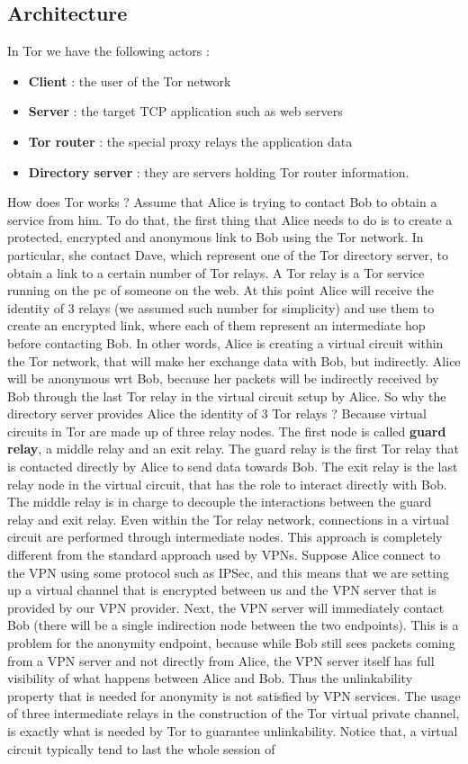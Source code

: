 \subsection{Architecture}
In Tor we have the following actors :
\begin{itemize}
\item \textbf{Client} : the user of the Tor network
\item \textbf{Server} : the target TCP application such as web servers
\item \textbf{Tor router} : the special proxy relays the application data
\item \textbf{Directory server} : they are servers holding Tor router information.
\end{itemize}
How does Tor works ? Assume that Alice is trying to contact Bob to obtain a service from him. To do that, the first thing that Alice needs to do is to create a protected, encrypted and anonymous link to Bob using the Tor network. In particular, she contact Dave, which represent one of the Tor directory server, to obtain a link to a certain number of Tor relays. A Tor relay is a Tor service running on the pc of someone on the web. At this point Alice will receive the identity of $3$ relays (we assumed such number for simplicity) and use them to create an encrypted link, where each of them represent an intermediate hop before contacting Bob. In other words, Alice is creating a virtual circuit within the Tor network, that will make her exchange data with Bob, but indirectly. Alice will be anonymous wrt Bob, because her packets will be indirectly received by Bob through the last Tor relay in the virtual circuit setup by Alice. So why the directory server provides Alice the identity of $3$ Tor relays ? Because virtual circuits in Tor are made up of three relay nodes. The first node is called \textbf{guard relay}, a middle relay and an exit relay. The guard relay is the first Tor relay that is contacted directly by Alice to send data towards Bob. The exit relay is the last relay node in the virtual circuit, that has the role to interact directly with Bob. The middle relay is in charge to decouple the interactions between the guard relay and exit relay. Even within the Tor relay network, connections in a virtual circuit are performed through intermediate nodes. This approach is completely different from the standard approach used by VPNs. Suppose Alice connect to the VPN using some protocol such as IPSec, and this means that we are setting up a virtual channel that is encrypted between us and the VPN server that is provided by our VPN provider. Next, the VPN server will immediately contact Bob (there will be a single indirection node between the two endpoints). This is a problem for the anonymity endpoint, because while Bob still sees packets coming from a VPN server and not directly from Alice, the VPN server itself has full visibility of what happens between Alice and Bob. Thus the unlinkability property that is needed for anonymity is not satisfied by VPN services. The usage of three intermediate relays in the construction of the Tor virtual private channel, is exactly what is needed by Tor to guarantee unlinkability. Notice that, a virtual circuit typically tend to last the whole session of 